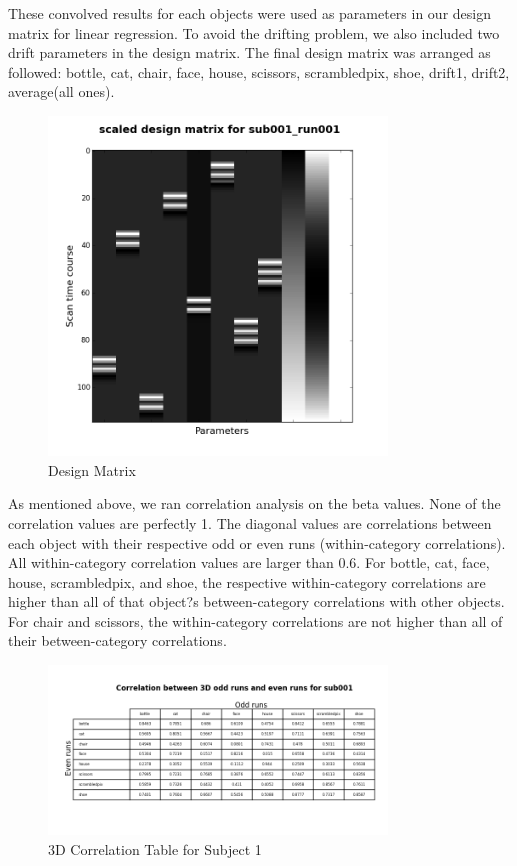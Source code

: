 \documentclass[11pt,twocolumn]{article}
\begin{document}
These convolved results for each objects were used as parameters in 
our design matrix for linear regression. To avoid the drifting problem, we also 
included two drift parameters in the design matrix. The final design matrix was 
arranged as followed: bottle, cat, chair, face, house, scissors, scrambledpix, 
shoe, drift1, drift2, average(all ones). 
\begin{figure}[h!]
\centering
\includegraphics[width=90mm]{design_matrix_sub001_run001.png}
\caption{Design Matrix}
\end{figure}

As mentioned above, we ran correlation analysis on the beta values.
None of the correlation values are perfectly 1. The diagonal values 
are correlations between each object with their respective odd or 
even runs (within-category correlations). All within-category correlation 
values are larger than 0.6. For bottle, cat, face, house, scrambledpix, 
and shoe, the respective within-category correlations are higher than 
all of that object?s between-category correlations with other objects. 
For chair and scissors, the within-category correlations are not higher 
than all of their between-category correlations.
\begin{figure}[h!]
\centering
\includegraphics[width=90mm]{3d_correlation_table_sub001.png}
\caption{3D Correlation Table for Subject 1}
\end{figure}
\end{document}
